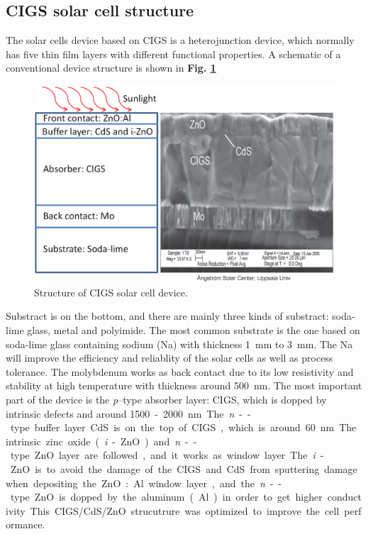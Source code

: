 \documentclass[a4paper, 12pt, titlepage,oneside,drop]{kthesis}
\begin{document}
\subsection{CIGS solar cell structure}

The solar cells device based on CIGS is a heterojunction device, which normally has five thin film layers with different functional properties. A schematic of a conventional device structure is shown in  \textbf{Fig. \ref{device}}

\begin{figure}[H]
\centering
\includegraphics[scale=0.5]{devicestruc.eps} 
\caption{Structure of CIGS solar cell device.}
\label{device}
\end{figure}

Substract is on the bottom, and there are mainly three kinds of substract: soda-lime glass, metal and polyimide. The most common substrate is the one based on soda-lime glass containing sodium (Na) with thickness 
\SI{1} {\mm} to \SI{3} {\mm}. The Na will improve the efficiency and reliablity of the solar cells as well as process tolerance. The molybdenum works as back contact due to its low resistivity and stability at high 
temperature with thickness around \SI{500} {\nm}. The most important part of the device is the \textit{p}--type absorber layer: CIGS, which is dopped by intrinsic defects and around \SI{1500} - \SI{2000} {\nm}. 
The \textit{n}--type buffer layer CdS is on the top of CIGS, which is around \SI{60} {\nm}. The intrinsic zinc oxide (\textit{i}-ZnO) and \textit{n}--type ZnO layer are followed, and it works as window layer. The \textit{i}-ZnO is to 
avoid the damage of the CIGS and CdS from sputtering damage when depositing the ZnO:Al window layer, and the \textit{n}--type ZnO is dopped by the aluminum (Al) in order to get higher conductivity. 
This CIGS/CdS/ZnO strucutrure was optimized to improve the cell performance.
\end{document}
